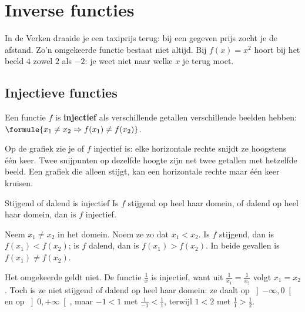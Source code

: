 \begin{oefeningen}

\end{oefeningen}

\section{Inverse functies}

In de Verken draaide je een taxiprijs terug: bij een gegeven prijs zocht je de afstand. Zo'n omgekeerde functie bestaat niet altijd. Bij $f(x) = x^2$ hoort bij het beeld $4$ zowel $2$ als $-2$: je weet niet naar welke $x$ je terug moet.

\subsection{Injectieve functies}

\begin{theorie}
Een functie $f$ is \textbf{\textcolor{accent}{injectief}} als verschillende getallen verschillende beelden hebben: $\formule{x_1 \neq x_2 \Rightarrow f(x_1) \neq f(x_2)}$.
\end{theorie}

Op de grafiek zie je of $f$ injectief is: elke horizontale rechte snijdt ze hoogstens één keer. Twee snijpunten op dezelfde hoogte zijn net twee getallen met hetzelfde beeld. Een grafiek die alleen stijgt, kan een horizontale rechte maar één keer kruisen.

\begin{theorie}
\begin{stelling}{Stijgend of dalend is injectief}
Is $f$ stijgend op heel haar domein, of dalend op heel haar domein, dan is $f$ injectief.
\end{stelling}

\begin{bewijs}
Neem $x_1 \neq x_2$ in het domein. Noem ze zo dat $x_1 < x_2$. Is $f$ stijgend, dan is $f(x_1) < f(x_2)$; is $f$ dalend, dan is $f(x_1) > f(x_2)$. In beide gevallen is $f(x_1) \neq f(x_2)$.
\end{bewijs}
\end{theorie}

Het omgekeerde geldt niet. De functie $\frac1x$ is injectief, want uit $\frac{1}{x_1} = \frac{1}{x_2}$ volgt $x_1 = x_2$. Toch is ze niet stijgend of dalend op heel haar domein: ze daalt op $\left]-\infty, 0\right[$ en op $\left]0, +\infty\right[$, maar $-1 < 1$ met $\frac{1}{-1} < \frac11$, terwijl $1 < 2$ met $\frac11 > \frac12$.

